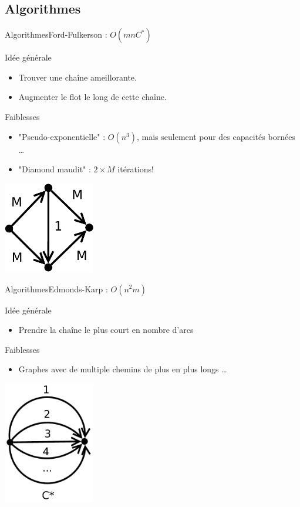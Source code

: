 \subsection{Algorithmes}
\begin{frame}{Algorithmes}{Ford-Fulkerson : $O(mnC^*)$}

\begin{block}{Idée générale}
\begin{itemize}
\item Trouver une chaîne ameillorante.
\item Augmenter le flot le long de cette chaîne.
\end{itemize}
\end{block}

\begin{block}{Faiblesses}
\begin{itemize}
\item "Pseudo-exponentielle" : $O(n^3)$, mais seulement pour des capacités bornées \ldots
\item "Diamond maudit" : $2\times{M}$ itérations! 
\end{itemize}
\end{block}
\includegraphics[width=0.3\textwidth]{img/maudit}

\end{frame}
\begin{frame}{Algorithmes}{Edmonds-Karp : $O(n^2m)$}

\begin{block}{Idée générale}
\begin{itemize}
\item Prendre la chaîne le plus court en nombre d'arcs
\end{itemize}
\end{block}

\begin{block}{Faiblesses}
\begin{itemize}
\item Graphes avec de multiple chemins de plus en plus longs \dots
\end{itemize}
\end{block}
\includegraphics[width=0.3\textwidth]{img/anti_ek}

\end{frame}

